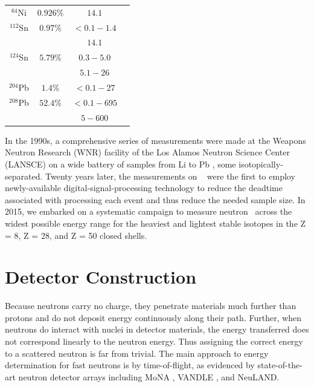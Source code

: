 \begin{table}[ht]
\begin{center}
\begin{tabular}{ c c c c }
            $^{64}$Ni & $0.926\%$ & $14.1$ & \cite{Dukarevich1967}\\

            $^{112}$Sn & $0.97\%$ & $<0.1-1.4$ & \cite{Timokhov1989}\\
            & & $14.1$ & \cite{Dukarevich1967}\\

            $^{124}$Sn & $5.79\%$ & $0.3-5.0$ & \cite{Harper1982}\\
            & & $5.1-26$ & \cite{Rapaport1980}\\

            $^{204}$Pb & $1.4\%$ & $<0.1-27$ & \cite{Carlton2003}\\

            $^{208}$Pb & $52.4\%$ & $<0.1 - 695$ & \cite{Harvey1999}\\
            & & $5-600$ & \cite{Finlay1993}\\

            \hline
        \end{tabular}
    \end{center}
\end{table}

In the 1990s, a comprehensive series of measurements were made at the Weapons Neutron Research (WNR)
facility of the Los Alamos Neutron Science Center (LANSCE) on a wide battery of samples from Li to
Pb \cite{Finlay1993, Abfalterer2001}, some isotopically-separated. Twenty years
later, the measurements on \caAughtEight\ \cite{Shane2010} were the first 
to employ newly-available digital-signal-processing technology to reduce the deadtime associated
with processing each event and thus reduce the needed sample size. In 2015, we
embarked on a systematic campaign to measure neutron \tot\ across the widest possible energy range
for the heaviest and lightest stable isotopes in the Z = 8, Z = 28, and Z = 50 closed shells.

\section{Detector Construction}
Because neutrons carry no charge, they penetrate materials much further than protons and do not
deposit energy continuously along their path. Further, when neutrons do interact with nuclei in
detector materials, the energy transferred does not correspond linearly to the neutron energy. Thus
assigning the correct energy to a scattered neutron is far from trivial. The main approach to
energy determination for fast neutrons is by time-of-flight, as evidenced by state-of-the-art
neutron detector arrays including MoNA \cite{MoNA}, VANDLE \cite{VANDLE}, and
NeuLAND\cite{NeuLAND}.

